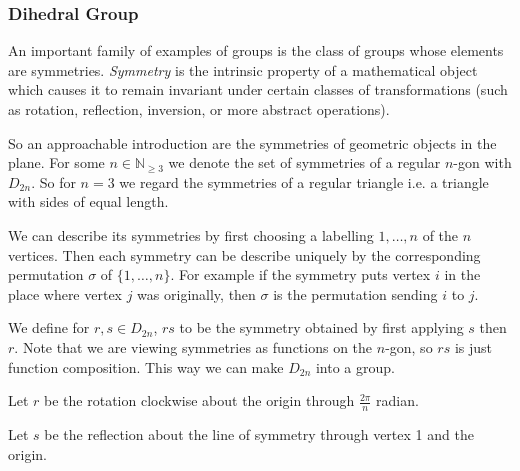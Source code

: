 \subsubsection{Dihedral Group}\label{ssec:dihedral_groups}
An important family of examples of groups is the class of groups whose elements are symmetries.
\emph{Symmetry} is the intrinsic property of a mathematical object which causes it to remain invariant under certain classes of transformations (such as rotation, reflection, inversion, or more abstract operations).

So an approachable introduction are the symmetries of geometric objects in the plane.
For some \(n \in \mathbb{N}_{\geq 3}\) we denote the set of symmetries of a regular \(n\)-gon with \(D_{2n}\).
So for \(n=3\) we regard the symmetries of a regular triangle i.e. a triangle with sides of equal length.

We can describe its symmetries by first choosing a labelling \(1, \ldots, n\) of the \(n\) vertices.
Then each symmetry can be describe uniquely by the corresponding permutation \(\sigma\) of \(\{1, \ldots, n\}\).
For example if the symmetry puts vertex \(i\) in the place where vertex \(j\) was originally, then \(\sigma\) is the permutation sending \(i\) to \(j\).

\begin{center}
   
\end{center}

We define for \(r,s \in D_{2n}\), \(rs\) to be the symmetry obtained by first applying \(s\) then \(r\).
Note that we are viewing symmetries as functions on the \(n\)-gon, so \(rs\) is just function composition.
This way we can make \(D_{2n}\) into a group.

Let \(r\) be the rotation clockwise about the origin through \(\frac{2\pi}{n}\) radian.

Let \(s\) be the reflection about the line of symmetry through vertex 1 and the origin.

